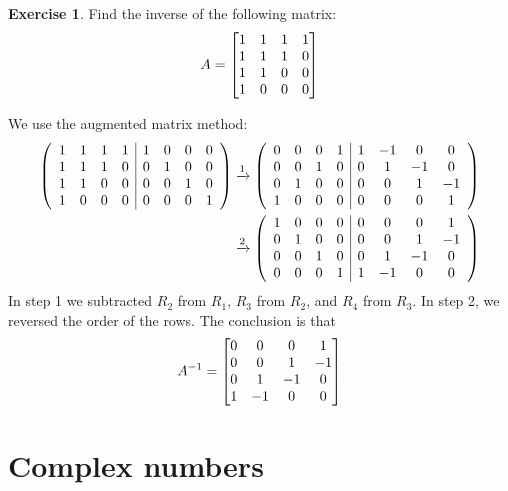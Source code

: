 \documentclass[a4paper]{book}
\theoremstyle{definition}
\newtheorem{exercise}[theorem]{Exercise}
\renewenvironment{solution}{\SolutionInline}{\endSolutionInline}
\begin{document}
\begin{exercise}
 Find the inverse of the following matrix:
 \[ A = \begin{bmatrix}
          1 & 1 & 1 & 1 \\
          1 & 1 & 1 & 0 \\
          1 & 1 & 0 & 0 \\
          1 & 0 & 0 & 0
        \end{bmatrix}
 \]
\end{exercise}
\begin{solution}
 We use the augmented matrix method:
 \begin{align*}
   \left(\begin{array}{cccc|cccc}
     1&1&1&1 &1&0&0&0 \\
     1&1&1&0 &0&1&0&0 \\
     1&1&0&0 &0&0&1&0 \\
     1&0&0&0 &0&0&0&1
   \end{array}\right) & \xrightarrow{1}
   \left(\begin{array}{cccc|cccc}
     0&0&0&1 & 1&-1& 0& 0 \\
     0&0&1&0 & 0& 1&-1& 0 \\
     0&1&0&0 & 0& 0& 1&-1 \\
     1&0&0&0 & 0& 0& 0& 1
   \end{array}\right) \\ & \xrightarrow{2}
   \left(\begin{array}{cccc|cccc}
     1&0&0&0 & 0& 0& 0& 1 \\
     0&1&0&0 & 0& 0& 1&-1 \\
     0&0&1&0 & 0& 1&-1& 0 \\
     0&0&0&1 & 1&-1& 0& 0
   \end{array}\right)
 \end{align*}
 In step 1 we subtracted $R_2$ from $R_1$, $R_3$ from $R_2$, and $R_4$
 from $R_3$.  In step 2, we reversed the order of the rows.  The
 conclusion is that
 \[ A^{-1} =
     \begin{bmatrix} 0& 0& 0& 1 \\
          0& 0& 1&-1 \\
          0& 1&-1& 0 \\
          1&-1& 0& 0    \end{bmatrix}
 \]
\end{solution}


\hypertarget{appendices}{\appendix}

\chapter{Complex numbers}
\label{apx-complex}
\end{document}
